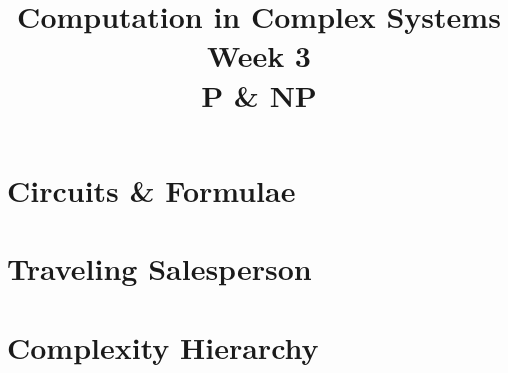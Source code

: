 \documentclass[]{article}
\title{Computation in Complex Systems\\
	Week 3\\
	P \& NP}
\begin{document}
\maketitle

\section{Circuits \& Formulae}

\section{Traveling Salesperson}

\section{Complexity Hierarchy}
\end{document}
